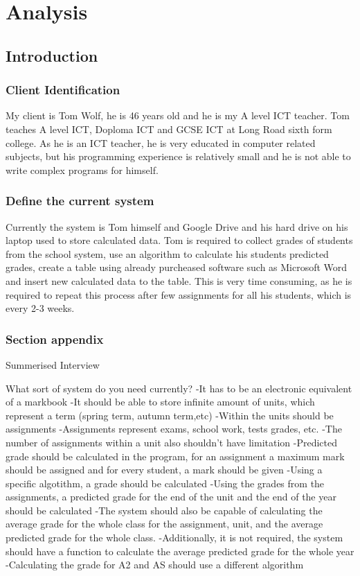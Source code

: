 \chapter{Analysis}

\section{Introduction}

\subsection{Client Identification} 
My client is Tom Wolf, he is 46 years old and he is my A level ICT teacher. Tom teaches A level ICT, Doploma ICT and GCSE ICT at Long Road sixth form college. As he is an ICT teacher, he is very educated in computer related subjects, but his programming experience is relatively small and he is not able to write complex programs for himself.

\subsection{Define the current system} 
Currently the system is Tom himself and Google Drive and his hard drive on his laptop used to store calculated data. Tom is required to collect grades of students from the school system, use an algorithm to calculate his students predicted grades, create a table using already purcheased software such as Microsoft Word and  insert new calculated data to the table. This is very time consuming, as he is required to repeat this process after few assignments for all his students, which is every 2-3 weeks.

\subsection{Section appendix}

Summerised Interview

What sort of system do you need currently?
-It has to be an electronic equivalent of a markbook
-It should be able to store infinite amount of units, which represent a term (spring term, autumn term,etc)
-Within the units should be assignments
-Assignments represent exams, school work, tests grades, etc.
-The number of assignments within a unit also shouldn't have limitation
-Predicted grade should be calculated in the program, for an assignment a maximum mark should be assigned and for every student, a mark should be given
-Using a specific algotithm, a grade should be calculated
-Using the grades from the assignments, a predicted grade for the end of the unit and the end of the year should be calculated
-The system should also be capable of calculating the average grade for the whole class for the assignment, unit, and the average predicted grade for the whole class.
-Additionally, it is not required, the system should have a function to calculate the average predicted grade for the whole year
-Calculating the grade for A2 and AS should use a different algorithm

